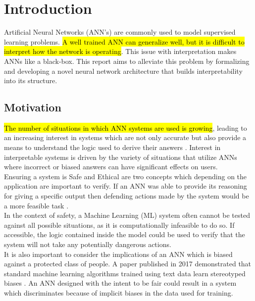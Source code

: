 \chapter{Introduction}\label{C:intro}

Artificial Neural Networks (ANN's) are commonly used to model supervised learning problems. \hl{A well trained ANN can generalize well, but it is difficult to interpret how the network is operating}. This issue with interpretation makes ANNs like a black-box. This report aims to alleviate this problem by formalizing and developing a novel neural network architecture that builds interpretability into its structure.

\section{Motivation}
\hl{The number of situations in which ANN systems are used is growing}, leading to an increasing interest in systems which are not only accurate but also provide a means to understand the logic used to derive their answers \cite{doshi2017towards}. Interest in interpretable systems is driven by the variety of situations that utilize ANNs where incorrect or biased answers can have significant effects on users.\\

Ensuring a system is Safe and Ethical are two concepts which depending on the application are important to verify. If an ANN was able to provide its reasoning for giving a specific output then defending actions made by the system would be a more feasible task \cite{doshi2017towards}.\\

In the context of safety, a Machine Learning (ML) system often cannot be tested against all possible situations, as it is computationally infeasible to do so. If accessible, the logic contained inside the model could be used to verify that the system will not take any potentially dangerous actions.\\

It is also important to consider the implications of an ANN which is biased against a protected class of people. A paper published in 2017 demonstrated that standard machine learning algorithms trained using text data learn stereotyped biases \cite{caliskan2017semantics}. An ANN designed with the intent to be fair could result in a system which discriminates because of implicit biases in the data used for training.\\

